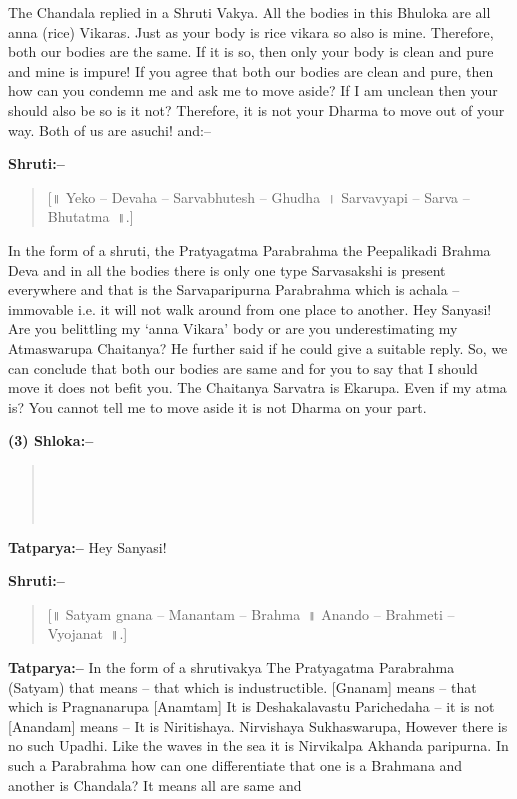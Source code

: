 The Chandala replied in a Shruti Vakya. All the bodies in this Bhuloka are all anna (rice) Vikaras. Just as your body is rice vikara so also is mine. Therefore, both our bodies are the same. If it is so, then only your body is clean and pure and mine is impure! If you agree that both our bodies are clean and pure, then how can you condemn me and ask me to move aside? If I am unclean then your should also be so is it not? Therefore, it is not your Dharma to move out of your way. Both of us are asuchi! and:–

\textbf{Shruti:–}

\begin{verse}
[॥ Yeko – Devaha – Sarvabhutesh – Ghudha~। Sarvavyapi – Sarva – Bhutatma~॥.]
\end{verse}

In the form of a shruti, the Pratyagatma Parabrahma the Peepalikadi Brahma Deva and in all the bodies there is only one type Sarvasakshi is present everywhere and that is the Sarvaparipurna Parabrahma which is achala – immovable i.e. it will not walk around from one place to another. Hey Sanyasi! Are you belittling my ‘anna Vikara’ body or are you underestimating my Atmaswarupa Chaitanya? He further said if he could give a suitable reply. So, we can conclude that both our bodies are same and for you to say that I should move it does not befit you. The Chaitanya Sarvatra is Ekarupa. Even if my atma is? You cannot tell me to move aside it is not Dharma on your part.

\textbf{(3) Shloka:–}

\begin{verse}
 \\\\\\
\end{verse}

\textbf{Tatparya:–} Hey Sanyasi!

\textbf{Shruti:–}

\begin{verse}
[॥ Satyam gnana – Manantam – Brahma~॥ Anando – Brahmeti – Vyojanat~॥.]
\end{verse}

\textbf{Tatparya:–} In the form of a shrutivakya The Pratyagatma Parabrahma (Satyam) that means – that which is industructible. [Gnanam] means – that which is Pragnanarupa [Anamtam] It is Deshakalavastu Parichedaha – it is not [Anandam] means – It is Niritishaya. Nirvishaya Sukhaswarupa, However there is no such Upadhi. Like the waves in the sea it is Nirvikalpa Akhanda paripurna. In such a Parabrahma how can one differentiate that one is a Brahmana and another is Chandala? It means all are same and

